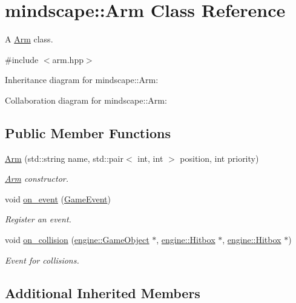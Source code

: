 \hypertarget{classmindscape_1_1_arm}{}\section{mindscape\+:\+:Arm Class Reference}
\label{classmindscape_1_1_arm}


A \hyperlink{classmindscape_1_1_arm}{Arm} class.  




{\ttfamily \#include $<$arm.\+hpp$>$}



Inheritance diagram for mindscape\+:\+:Arm\+:


Collaboration diagram for mindscape\+:\+:Arm\+:
\subsection*{Public Member Functions}
\begin{DoxyCompactItemize}
\item 
\hyperlink{classmindscape_1_1_arm_a1fbc9ae5b007132b16ad08e1d3695aeb}{Arm} (std\+::string name, std\+::pair$<$ int, int $>$ position, int priority)
\begin{DoxyCompactList}\small\item\em \hyperlink{classmindscape_1_1_arm}{Arm} constructor. \end{DoxyCompactList}\item 
void \hyperlink{classmindscape_1_1_arm_ae39e38ffd5567cd28202f51ee253b787}{on\+\_\+event} (\hyperlink{class_game_event}{Game\+Event})
\begin{DoxyCompactList}\small\item\em Register an event. \end{DoxyCompactList}\item 
void \hyperlink{classmindscape_1_1_arm_ac30e41db231cbf4be054dbe89572264b}{on\+\_\+collision} (\hyperlink{classengine_1_1_game_object}{engine\+::\+Game\+Object} $\ast$, \hyperlink{classengine_1_1_hitbox}{engine\+::\+Hitbox} $\ast$, \hyperlink{classengine_1_1_hitbox}{engine\+::\+Hitbox} $\ast$)
\begin{DoxyCompactList}\small\item\em Event for collisions. \end{DoxyCompactList}\end{DoxyCompactItemize}
\subsection*{Additional Inherited Members}


